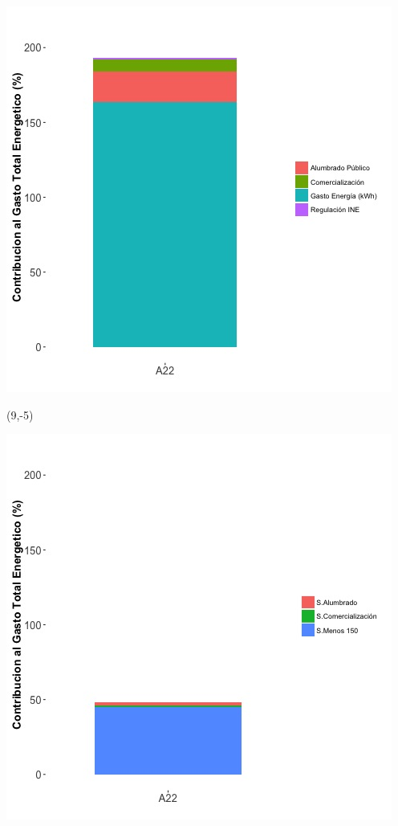 \documentclass{article}\usepackage[]{graphicx}\usepackage[]{color}
\newenvironment{knitrout}{}{} %
\begin{document}
\begin{knitrout}
\color{fgcolor}
\includegraphics[scale=0.65]{figure/A22_costvars_plot.jpg} 
\end{knitrout}

 \begin{textblock}{1}(9,-5)
\begin{minipage}{20em}
\begingroup

\endgroup
\end{minipage}
\end{textblock}

\begin{knitrout}
\color{fgcolor}
\includegraphics[scale=0.65]{figure/A22_subvars_plot.jpg} 
\end{knitrout}
\end{document}
